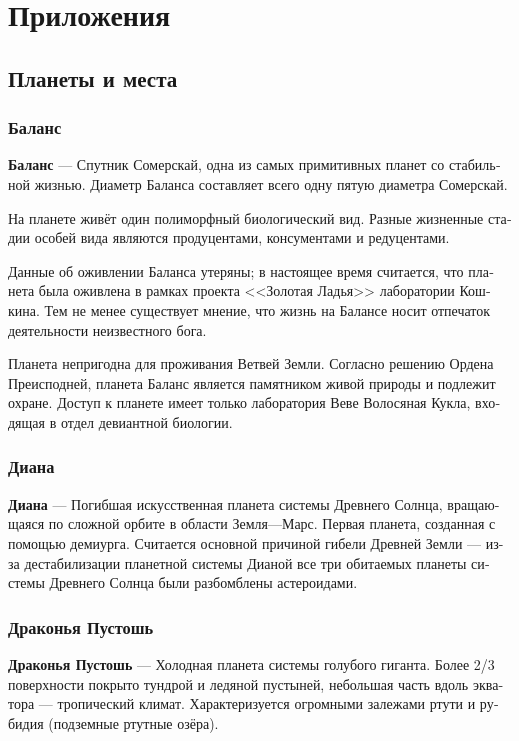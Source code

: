 \documentclass[a4paper,12pt,fleqn]{book}\usepackage{polyglossia}\setdefaultlanguage[babelshorthands=true]{russian}\setotherlanguage{english}\defaultfontfeatures{Ligatures=TeX,Mapping=tex-text}\usepackage{xcolor}\newcommand{\ml}[3]{#2}
\newcommand{\theterm}[3]{\textbf{\hypertarget{#1}{#2}} --- #3}
\begin{document}
\part*{Приложения}

\appendix

\chapter{Планеты и места}

\section{Баланс}
 
\theterm{balance}
{Баланс}
{Спутник Сомерскай, одна из самых примитивных планет со стабильной жизнью.
Диаметр Баланса составляет всего одну пятую диаметра Сомерскай.

На планете живёт один полиморфный биологический вид.
Разные жизненные стадии особей вида являются продуцентами, консументами и редуцентами.

Данные об оживлении Баланса утеряны;
в настоящее время считается, что планета была оживлена в рамках проекта <<Золотая Ладья>> лаборатории Кошкина.
Тем не менее существует мнение, что жизнь на Балансе носит отпечаток деятельности неизвестного бога.

Планета непригодна для проживания Ветвей Земли.
Согласно решению Ордена Преисподней, планета Баланс является памятником живой природы и подлежит охране.
Доступ к планете имеет только лаборатория Веве Волосяная Кукла, входящая в отдел девиантной биологии.}

\section{Диана}

\theterm{diana}
{Диана}
{Погибшая искусственная планета системы Древнего Солнца, вращающаяся по сложной орбите в области Земля---Марс.
Первая планета, созданная с помощью демиурга.
Считается основной причиной гибели Древней Земли --- из-за дестабилизации планетной системы Дианой все три обитаемых планеты системы Древнего Солнца были разбомблены астероидами.}

\section{Драконья Пустошь}

\theterm{drake-desert}
{Драконья Пустошь}
{Холодная планета системы голубого гиганта.
Более 2/3 поверхности покрыто тундрой и ледяной пустыней, небольшая часть вдоль экватора --- тропический климат.
Характеризуется огромными залежами ртути и рубидия (подземные ртутные озёра).}
\end{document}
